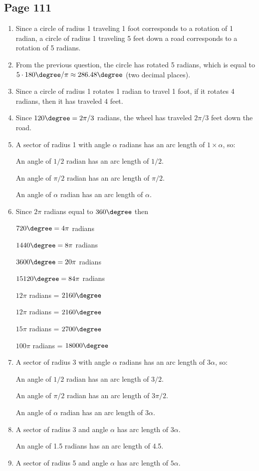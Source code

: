 \documentclass{article}
\newenvironment{solutions}[1]
{\subsection*{#1}
 \begin{enumerate}[leftmargin=1.5em]}
{\end{enumerate}}
\newcommand{\solution}{\item}
\begin{document}
\begin{solutions}{Page 111}
\solution %
Since a circle of radius 1 traveling 1 foot corresponds to a rotation of 1 radian, a circle of radius 1 traveling 5 feet down a road corresponds to a rotation of 5 radians.

\solution %
From the previous question, the circle has rotated 5 radians, which is equal to $5 \cdot 180\degree / \pi \approx 286.48\degree$ (two decimal places).

\solution %
Since a circle of radius 1 rotates 1 radian to travel 1 foot, if it rotates 4 radians, then it has traveled 4 feet.

\solution %
Since $120\degree = 2\pi/3$ radians, the wheel has traveled $2\pi/3$ feet down the road.

\solution %
A sector of radius 1 with angle $\alpha$ radians has an arc length of $1 \times \alpha$, so:

An angle of $1/2$ radian has an arc length of $1/2$.

An angle of $\pi/2$ radian has an arc length of $\pi/2$.

An angle of $\alpha$ radian has an arc length of $\alpha$.

\solution %
Since $2\pi$ radians equal to $360\degree$ then

$720\degree = 4\pi$ radians

$1440\degree = 8\pi$ radians

$3600\degree = 20\pi$ radians

$15120\degree = 84\pi$ radians

$12\pi$ radians = $2160\degree$

$12\pi$ radians = $2160\degree$

$15\pi$ radians = $2700\degree$

$100\pi$ radians = $18000\degree$

\solution %
A sector of radius 3 with angle $\alpha$ radians has an arc length of $3\alpha$, so:

An angle of $1/2$ radian has an arc length of $3/2$.

An angle of $\pi/2$ radian has an arc length of $3\pi/2$.

An angle of $\alpha$ radian has an arc length of $3\alpha$.

\solution %
A sector of radius 3 and angle $\alpha$ has arc length of $3\alpha$.

An angle of 1.5 radians has an arc length of 4.5.

\solution %
A sector of radius 5 and angle $\alpha$ has arc length of $5\alpha$.


\end{solutions}
\end{document}
